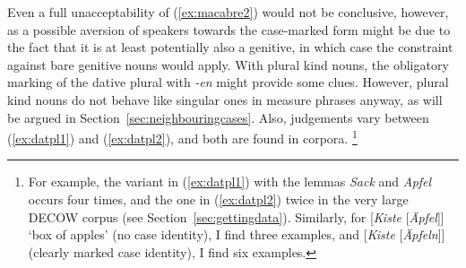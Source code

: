 \begin{exe}
  \ex\label{ex:macabre}
  \begin{xlist}
  \end{xlist}
\end{exe}

Even a full unacceptability of (\ref{ex:macabre2}) would not be conclusive, however, as a possible aversion of speakers towards the case-marked form might be due to the fact that it is at least potentially also a genitive, in which case the constraint against bare genitive nouns would apply.
With plural kind nouns, the obligatory marking of the dative plural with \textit{-en} might provide some clues.
However, plural kind nouns do not behave like singular ones in measure phrases anyway, as will be argued in Section~\ref{sec:neighbouringcases}.
Also, judgements vary between (\ref{ex:datpl1}) and (\ref{ex:datpl2}), and both are found in corpora.%
\footnote{For example, the variant in (\ref{ex:datpl1}) with the lemmas \textit{Sack} and \textit{Apfel} occurs four times, and the one in (\ref{ex:datpl2}) twice in the very large DECOW corpus (see Section~\ref{sec:gettingdata}).
Similarly, for [\textit{Kiste} [\textit{Äpfel}]] `box of apples' (no case identity), I find three examples, and [\textit{Kiste} [\textit{Äpfeln}]] (clearly marked case identity), I find six examples.
}

\begin{exe}
  \ex\label{ex:datpl} 
  \begin{xlist}
  \end{xlist}
\end{exe}

